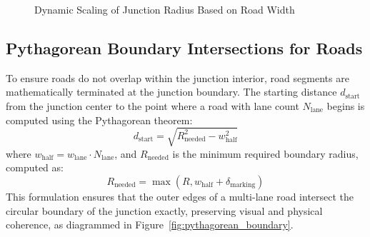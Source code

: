 \documentclass[../report_main.tex]{subfiles}
\begin{document}
\begin{figure}[H]
  \caption{Dynamic Scaling of Junction Radius Based on Road Width}
  \label{fig:junction_radius}
\end{figure}

\subsection{Pythagorean Boundary Intersections for Roads}
To ensure roads do not overlap within the junction interior, road segments are mathematically terminated at the junction boundary. The starting distance $d_{\text{start}}$ from the junction center to the point where a road with lane count $N_{\text{lane}}$ begins is computed using the Pythagorean theorem:
\begin{equation}
    d_{\text{start}} = \sqrt{R_{\text{needed}}^2 - w_{\text{half}}^2}
\end{equation}
where $w_{\text{half}} = w_{\text{lane}} \cdot N_{\text{lane}}$, and $R_{\text{needed}}$ is the minimum required boundary radius, computed as:
\begin{equation}
    R_{\text{needed}} = \max \left( R, w_{\text{half}} + \delta_{\text{marking}} \right)
\end{equation}
This formulation ensures that the outer edges of a multi-lane road intersect the circular boundary of the junction exactly, preserving visual and physical coherence, as diagrammed in Figure~\ref{fig:pythagorean_boundary}.
\end{document}
